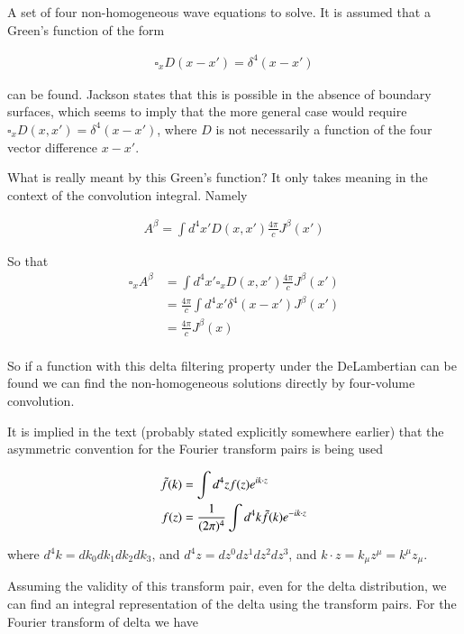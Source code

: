A set of four non-homogeneous wave equations to solve.  It is assumed that a Green's function of the form

\begin{align}\label{eqn:jacksonRet:boo4}
\square_x D(x - x') = \delta^4(x - x')
\end{align}

can be found.  Jackson states that this is possible in the absence of boundary surfaces, which seems to imply that the more general case would require $\square_x D(x, x') = \delta^4(x - x')$, where $D$ is not necessarily a function of the four vector difference $x - x'$.

What is really meant by this Green's function?  It only takes meaning in the context of the convolution integral.  Namely

\begin{align}\label{eqn:jacksonRet:boo5}
A^\beta = \int d^4 x' D(x, x') \frac{4 \pi}{c} J^\beta(x') 
\end{align}

So that
\begin{align*}
\square_x A^\beta 
&= \int d^4 x' \square_x D(x, x') \frac{4 \pi}{c} J^\beta(x') \\
&= \frac{4 \pi}{c} \int d^4 x' \delta^4(x - x') J^\beta(x') \\
&= \frac{4 \pi}{c} J^\beta(x) \\
\end{align*}

So if a function with this delta filtering property under the DeLambertian can be found we can find the non-homogeneous solutions directly by four-volume convolution.

It is implied in the text (probably stated explicitly somewhere earlier) that the asymmetric convention for the Fourier transform pairs is being used

\begin{align}\label{eqn:jacksonRet:boo6}
\tilde{f}(k) &= \int d^4 z f(z) e^{i k \cdot z} \\
f(z) &= \frac{1}{(2\pi)^4} \int d^4 k \tilde{f}(k) e^{-i k \cdot z} 
\end{align}

where $d^4 k = dk_0 dk_1 dk_2 dk_3$, and $d^4 z = dz^0 dz^1 dz^2 dz^3$, and $k \cdot z = k_\mu z^\mu = k^\mu z_\mu$.

Assuming the validity of this transform pair, even for the delta distribution, we can find an integral representation of the delta using the transform pairs.  For the Fourier transform of delta we have

